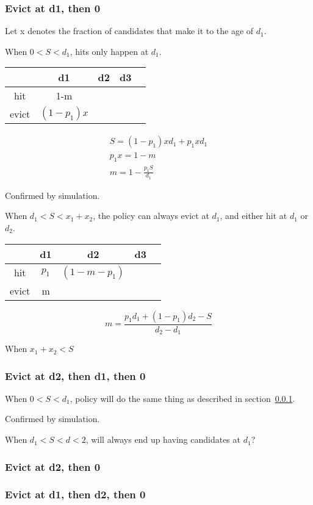 \documentclass[12pt, letterpaper]{article}
\begin{document}
\subsubsection{Evict at d1, then 0}
\label{sec:d1-0}

Let x denotes the fraction of candidates that make it to the age of $d_1$.

When $0<S<d_1$, hits only happen at $d_1$. 

\begin{center}
\begin{tabular}{ c | c c c c }
\hline
 		& d1  & d2 & d3\\ 
\hline
 hit 	& 1-m & &\\  
 evict 	& $(1-p_1)x$   & &\\
\hline
\end{tabular}
\end{center}

\begin{equation}
\begin{gathered}
S = (1-p_1)xd_1 + p_1 x d_1 \\
p_1 x = 1 - m \\
m = 1 - \frac{p_1 S}{d_1}
\end{gathered}
\end{equation}

Confirmed by simulation.

When $d_1<S< x_1 + x_2$, the policy can always evict at $d_1$, and either hit at $d_1$
or $d_2$. 
\begin{center}
\begin{tabular}{ c | c c c c }
\hline
      & d1    & d2 & d3\\ 
\hline 
hit   & $p_1$ & $(1-m-p_1)$ &\\
evict & m   & & \\
\hline 
\end{tabular}
\end{center}

\begin{equation}
m = \frac{p_1 d_1 + (1-p_1) d_2 - S}{d_2 - d_1}
\end{equation}

When $ x_1 + x_2 < S $ 

\subsubsection{Evict at d2, then d1, then 0}

When $0<S<d_1$, policy will do the same thing as described in
section~\ref{sec:d1-0}. 

Confirmed by simulation.

When $d_1<S<d<2$, will always end up having candidates at $d_1$?

\subsubsection{Evict at d2, then 0}
\subsubsection{Evict at d1, then d2, then 0}
\end{document}
